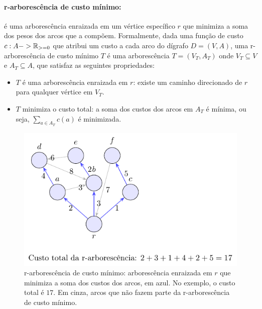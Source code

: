 \documentclass[12pt,a4paper]{article}
\def\geq{\string>=}%
\def\to{->}%
\begin{document}
\paragraph{r-arborescência de custo mínimo:}
é uma arborescência enraizada em um vértice específico \(r\) que minimiza a soma dos pesos dos arcos que a compõem. Formalmente, dada uma função de custo \(c: A \to \mathbb{R}_{\geq 0}\) que atribui um custo a cada arco do dígrafo \(D = (V, A)\), uma r-arborescência de custo mínimo \(T\) é uma arborescência \(T = (V_T, A_T)\) onde \(V_T \subseteq V\) e \(A_T \subseteq A\), que satisfaz as seguintes propriedades:
\begin{itemize}
    \item \(T\) é uma arborescência enraizada em \(r\): existe um caminho direcionado de \(r\) para qualquer vértice em \(V_T\).
    \item \(T\) minimiza o custo total: a soma dos custos dos arcos em \(A_T\) é mínima, ou seja, \(\sum_{a \in A_T} c(a)\) é minimizada.
\end{itemize}

\begin{figure}[H]
    \centering
    \includegraphics[width=0.9\linewidth]{figures/fig_r_arborescencia_custo_minimo.pdf}

    \caption{r-arborescência de custo mínimo: arborescência enraizada em $r$ que minimiza a soma dos custos dos arcos, em azul. No exemplo, o custo total é $17$. Em cinza, arcos que não fazem parte da r-arborescência de custo mínimo.}
    \label{fig:r-arborescencia-custo-minimo}\end{figure}
\end{document}
